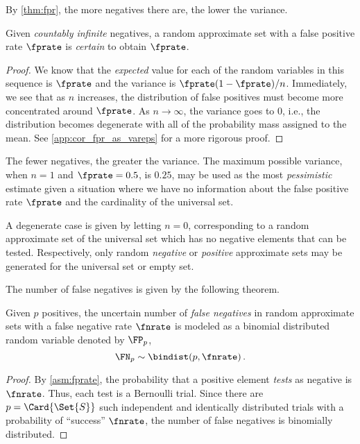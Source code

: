 \documentclass[ ../main.tex]{subfiles}
\begin{document}
By \cref{thm:fpr}, the more negatives there are, the lower the variance.
\begin{corollary}
\label{cor:fpr_as_vareps}
	Given \emph{countably infinite} negatives, a random approximate set with a false positive rate $\fprate$ is \emph{certain} to obtain $\fprate$.
\end{corollary}
\begin{proof}
We know that the \emph{expected} value for each of the random variables in this sequence is $\fprate$ and the variance is $\fprate(1-\fprate)/n$.
Immediately, we see that as $n$ increases, the distribution of false positives must become more concentrated around $\fprate$.
As $n \to \infty$, the variance goes to $0$, i.e., the distribution becomes degenerate with all of the probability mass assigned to the mean. See \cref{app:cor_fpr_as_vareps} for a more rigorous proof.
\end{proof}

The fewer negatives, the greater the variance.
The maximum possible variance, when $n=1$ and $\fprate = 0.5$, is $0.25$, may be used as the most \emph{pessimistic} estimate given a situation where we have no information about the false positive rate $\fprate$ and the cardinality of the universal set.

A degenerate case is given by letting $n = 0$, corresponding to a random approximate set of the universal set which has no negative elements that can be tested.
Respectively, only random \emph{negative} or \emph{positive} approximate sets may be generated for the universal set or empty set.

The number of false negatives is given by the following theorem.
\begin{theorem}
\label{thm:fnbinom}
Given $p$ positives, the uncertain number of \emph{false negatives} in random approximate sets with a false negative rate $\fnrate$ is modeled as a binomial distributed random variable denoted by $\FP_p$,
\begin{equation}
	\FN_p \sim \bindist(p, \fnrate)\,.
\end{equation}
\end{theorem}
\begin{proof}
By \cref{asm:fprate}, the probability that a positive element \emph{tests} as negative is $\fnrate$.
Thus, each test is a Bernoulli trial.
Since there are $p = \Card{\Set{S}}$ such independent and identically distributed trials with a probability of ``success'' $\fnrate$, the number of false negatives is binomially distributed.
\end{proof}
\end{document}
